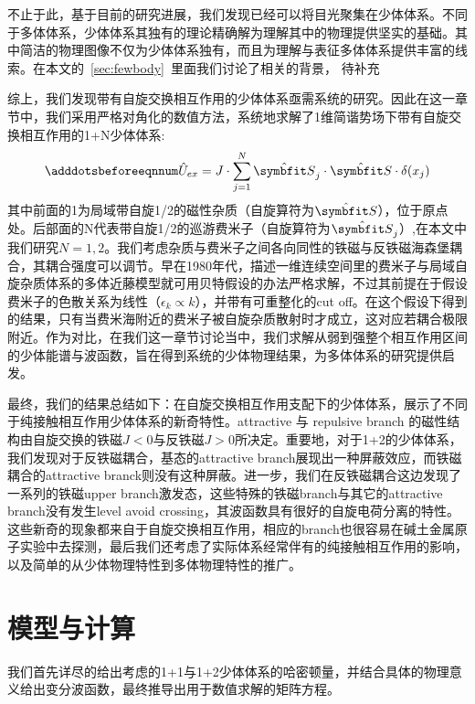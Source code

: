 不止于此，基于目前的研究进展，我们发现已经可以将目光聚集在少体体系。不同于多体体系，少体体系其独有的理论精确解为理解其中的物理提供坚实的基础。其中简洁的物理图像不仅为少体体系独有，而且为理解与表征多体体系提供丰富的线索。在本文的~\ref{sec:fewbody}~里面我们讨论了相关的背景，{\color{red} 待补充 }


综上，我们发现带有自旋交换相互作用的少体体系亟需系统的研究。因此在这一章节中，我们采用严格对角化的数值方法，系统地求解了1维简谐势场下带有自旋交换相互作用的1+N少体体系:
\begin{equation}\label{eq:sp-ex}
    \adddotsbeforeeqnnum%
    \hat{U}_{ex} = J\cdot\sum_{j=1}^{N}\hat{\Vector{S}}_j\cdot\hat{\Vector{S}}\cdot \delta(x_j)
\end{equation}
其中前面的1为局域带自旋1/2的磁性杂质（自旋算符为$\hat{\Vector{S}}$），位于原点处。后部面的N代表带自旋1/2的巡游费米子（自旋算符为$\hat{\Vector{S}}_j$）,在本文中我们研究$N=1,2$。我们考虑杂质与费米子之间各向同性的铁磁与反铁磁海森堡耦合，其耦合强度可以调节。早在1980年代，描述一维连续空间里的费米子与局域自旋杂质体系的多体近藤模型就可用贝特假设的办法严格求解\cite{andrei1983solution}，不过其前提在于假设费米子的色散关系为线性（$\epsilon_k\propto k$），并带有可重整化的cut off。在这个假设下得到的结果，只有当费米海附近的费米子被自旋杂质散射时才成立，这对应若耦合极限附近。作为对比，在我们这一章节讨论当中，我们求解从弱到强整个相互作用区间的少体能谱与波函数，旨在得到系统的少体物理结果，为多体体系的研究提供启发。


最终，我们的结果总结如下：在自旋交换相互作用支配下的少体体系，展示了不同于纯接触相互作用少体体系的新奇特性。attractive 与 repulsive branch 的磁性结构由自旋交换的铁磁$J<0$与反铁磁$J>0$所决定。重要地，对于1+2的少体体系，我们发现对于反铁磁耦合，基态的attractive branch展现出一种屏蔽效应，而铁磁耦合的attractive branck则没有这种屏蔽。进一步，我们在反铁磁耦合这边发现了一系列的铁磁upper branch激发态，这些特殊的铁磁branch与其它的attractive branch没有发生level avoid crossing，其波函数具有很好的自旋电荷分离的特性。这些新奇的现象都来自于自旋交换相互作用，相应的branch也很容易在碱土金属原子实验中去探测，最后我们还考虑了实际体系经常伴有的纯接触相互作用的影响，以及简单的从少体物理特性到多体物理特性的推广。

\section{模型与计算}\label{sec:spex-model}
我们首先详尽的给出考虑的1+1与1+2少体体系的哈密顿量，并结合具体的物理意义给出变分波函数，最终推导出用于数值求解的矩阵方程。

